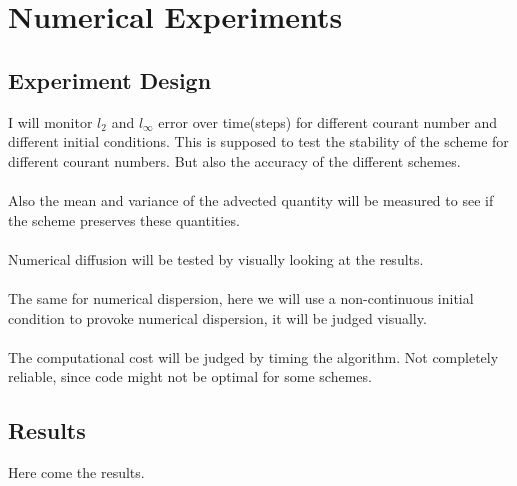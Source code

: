 \section{Numerical Experiments}
\subsection{Experiment Design}
I will monitor $l_2$ and $l_\infty$ error over time(steps) for different courant number and different initial conditions. 
This is supposed to test the stability of the scheme for different courant numbers. But also the accuracy of the different schemes.\\ \\
Also the mean and variance of the advected quantity will be measured to see if the scheme preserves these quantities. \\ \\
Numerical diffusion will be tested by visually looking at the results. \\ \\
The same for numerical dispersion, here we will use a non-continuous initial condition to provoke numerical dispersion, it will be judged visually. \\ \\
The computational cost will be judged by timing the algorithm. Not completely reliable, since code might not be optimal for some schemes. 
\subsection{Results}
Here come the results.
